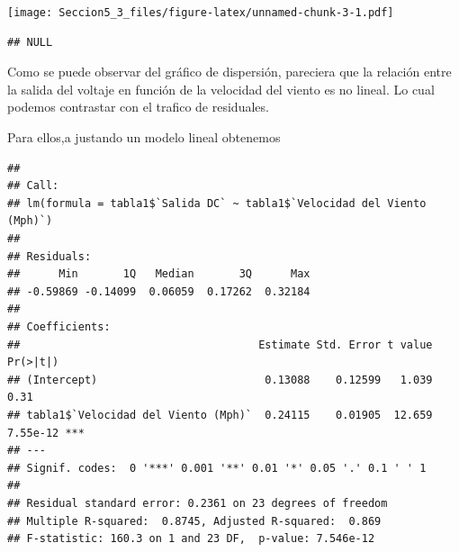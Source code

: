 \documentclass[
]{article}
\newenvironment{Shaded}{\begin{snugshade}}{\end{snugshade}}
\newcommand{\AttributeTok}[1]{\textcolor[rgb]{0.77,0.63,0.00}{#1}}
\newcommand{\FunctionTok}[1]{\textcolor[rgb]{0.00,0.00,0.00}{#1}}
\newcommand{\NormalTok}[1]{#1}
\newcommand{\OtherTok}[1]{\textcolor[rgb]{0.56,0.35,0.01}{#1}}
\newcommand{\SpecialCharTok}[1]{\textcolor[rgb]{0.00,0.00,0.00}{#1}}
\newcommand{\StringTok}[1]{\textcolor[rgb]{0.31,0.60,0.02}{#1}}
\begin{document}
\texttt{[image: Seccion5\_3\_files/figure-latex/unnamed-chunk-3-1.pdf]}

\begin{Shaded}
\end{Shaded}

\begin{verbatim}
## NULL
\end{verbatim}

Como se puede observar del gráfico de dispersión, pareciera que la
relación entre la salida del voltaje en función de la velocidad del
viento es no lineal. Lo cual podemos contrastar con el trafico de
residuales.

Para ellos,a justando un modelo lineal obtenemos

\begin{Shaded}
\end{Shaded}

\begin{verbatim}
## 
## Call:
## lm(formula = tabla1$`Salida DC` ~ tabla1$`Velocidad del Viento (Mph)`)
## 
## Residuals:
##      Min       1Q   Median       3Q      Max 
## -0.59869 -0.14099  0.06059  0.17262  0.32184 
## 
## Coefficients:
##                                     Estimate Std. Error t value Pr(>|t|)    
## (Intercept)                          0.13088    0.12599   1.039     0.31    
## tabla1$`Velocidad del Viento (Mph)`  0.24115    0.01905  12.659 7.55e-12 ***
## ---
## Signif. codes:  0 '***' 0.001 '**' 0.01 '*' 0.05 '.' 0.1 ' ' 1
## 
## Residual standard error: 0.2361 on 23 degrees of freedom
## Multiple R-squared:  0.8745, Adjusted R-squared:  0.869 
## F-statistic: 160.3 on 1 and 23 DF,  p-value: 7.546e-12
\end{verbatim}

\begin{Shaded}
\end{Shaded}
\end{document}
